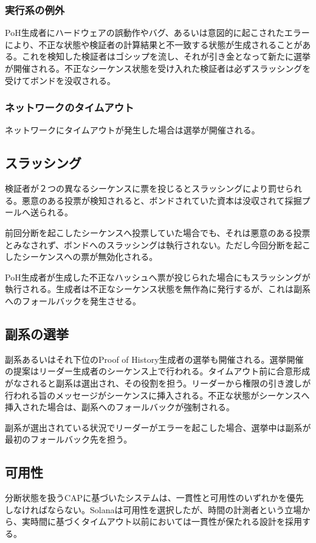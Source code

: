 \documentclass[12pt]{ltjsarticle}
\begin{document}
\subsubsection{実行系の例外}
PoH生成者にハードウェアの誤動作やバグ、あるいは意図的に起こされたエラーにより、不正な状態や検証者の計算結果と不一致する状態が生成されることがある。これを検知した検証者はゴシップを流し、それが引き金となって新たに選挙が開催される。不正なシーケンス状態を受け入れた検証者は必ずスラッシングを受けてボンドを没収される。

\subsubsection{ネットワークのタイムアウト}

ネットワークにタイムアウトが発生した場合は選挙が開催される。

\subsection{スラッシング}
検証者が２つの異なるシーケンスに票を投じるとスラッシングにより罰せられる。悪意のある投票が検知されると、ボンドされていた資本は没収されて採掘プールへ送られる。

前回分断を起こしたシーケンスへ投票していた場合でも、それは悪意のある投票とみなされず、ボンドへのスラッシングは執行されない。ただし今回分断を起こしたシーケンスへの票が無効化される。

PoH生成者が生成した不正なハッシュへ票が投じられた場合にもスラッシングが執行される。生成者は不正なシーケンス状態を無作為に発行するが、これは副系へのフォールバックを発生させる。

\subsection{副系の選挙}
副系あるいはそれ下位のProof of History生成者の選挙も開催される。選挙開催の提案はリーダー生成者のシーケンス上で行われる。タイムアウト前に合意形成がなされると副系は選出され、その役割を担う。リーダーから権限の引き渡しが行われる旨のメッセージがシーケンスに挿入される。不正な状態がシーケンスへ挿入された場合は、副系へのフォールバックが強制される。

副系が選出されている状況でリーダーがエラーを起こした場合、選挙中は副系が最初のフォールバック先を担う。

\subsection{可用性}\label{availability}
分断状態を扱うCAPに基づいたシステムは、一貫性と可用性のいずれかを優先しなければならない。Solanaは可用性を選択したが、時間の計測者という立場から、実時間に基づくタイムアウト以前においては一貫性が保たれる設計を採用する。
\end{document}
